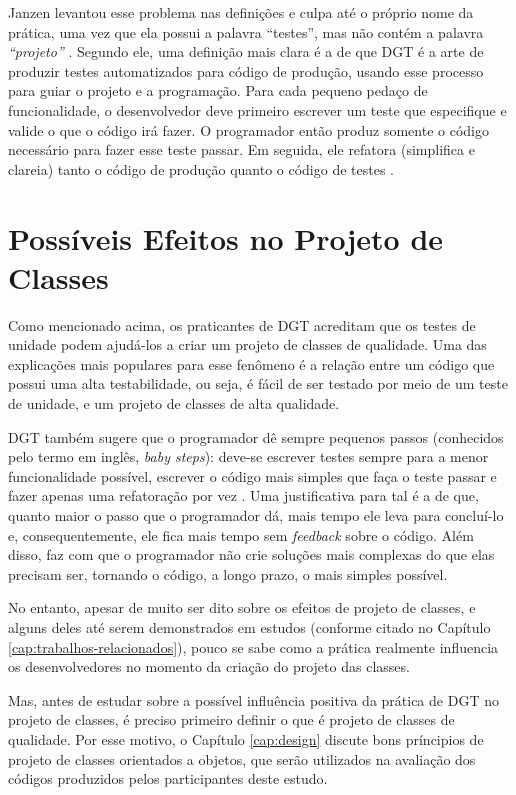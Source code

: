 Janzen levantou esse problema nas definições e culpa até o próprio nome da prática, uma vez
que ela possui a palavra ``testes'', mas não contém a palavra \textit{``projeto''} 
\cite{tdd-really-improve}.
Segundo ele, uma definição mais clara é a de que DGT é a arte de produzir testes
automatizados para código de produção, usando esse processo para guiar o projeto e a programação.
Para cada pequeno pedaço de funcionalidade, o desenvolvedor deve primeiro
escrever um teste que especifique e valide o que o código irá fazer. O
programador então produz somente o código necessário para fazer esse teste
passar. Em seguida, ele refatora (simplifica e clareia) tanto o código de produção
quanto o código de testes \cite{agilealliance-tdd} \cite{tdd-taxonomy}.

\section{Possíveis Efeitos no Projeto de Classes}

Como mencionado acima, os praticantes de DGT acreditam que os testes de unidade
podem ajudá-los a criar um projeto de classes de qualidade. Uma das explicações mais
populares para esse fenômeno é a relação
entre um código que possui uma alta testabilidade, ou seja, é fácil de ser testado
por meio de um teste de unidade, e um projeto de classes de alta qualidade.

DGT também sugere que o programador dê sempre pequenos passos (conhecidos pelo termo em
inglês, \textit{baby steps}): deve-se escrever testes sempre para a menor
funcionalidade possível, escrever o código mais simples que faça o teste passar
e fazer apenas uma refatoração por vez \cite{TDDByExample}.
Uma justificativa para tal é a de que, quanto maior o passo que o programador dá, mais
tempo ele leva para concluí-lo e, consequentemente, ele fica mais tempo
sem \textit{feedback} sobre o código. Além disso, faz com que o programador não crie
soluções mais complexas do que elas precisam ser, tornando o código, a longo
prazo, o mais simples possível.

No entanto, apesar de muito ser dito sobre os efeitos de projeto de classes, e alguns deles
até serem demonstrados em estudos (conforme citado no Capítulo \ref{cap:trabalhos-relacionados}), 
pouco se sabe como a prática realmente influencia os desenvolvedores no momento da criação do
projeto das classes.

Mas, antes de estudar sobre a possível influência positiva da prática de DGT no projeto de classes,
é preciso primeiro definir o que é projeto de classes de qualidade. Por esse motivo, o 
Capítulo \ref{cap:design}
discute bons príncipios de projeto de classes orientados a objetos, que serão utilizados
na avaliação dos códigos produzidos pelos participantes deste estudo.